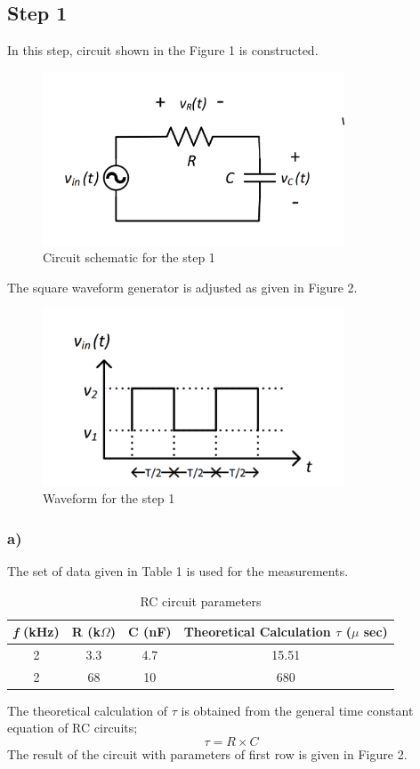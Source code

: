 \documentclass[letterpaper,12pt]{article}
\begin{document}
\subsection{Step 1}
In this step, circuit shown in the Figure 1  is constructed. 
\begin{figure}[H]
	\centering
   \includegraphics[width=0.8\textwidth]{1_sch.png}
   \caption{Circuit schematic for the step 1}
\end{figure} 
The square waveform generator is adjusted as given in Figure 2.
\begin{figure}[H]
	\centering
   \includegraphics[width=0.8\textwidth]{1_signal.png}
   \caption{Waveform for the step 1}
\end{figure} 


\subsubsection{a)}
The set of data given in Table 1 is used for the measurements.

\begin{table}[H]
\begin{center}
\caption{RC circuit parameters}
\vspace{2mm}
	\begin{tabular}{||c | c | c | c||} 
	 \hline
	 \emph{f} (kHz) & R (k\(\Omega\)) & C (nF) & Theoretical Calculation \(\tau\) (\(\mu\) sec) \\ [0.5ex] 
	 \hline\hline
	 2 & 3.3 & 4.7 & 15.51 \\ 
	 \hline
	 2& 68 & 10  & 680  \\
	 \hline
\end{tabular}
\end{center}
\end{table}
The theoretical calculation of \(\tau\) is obtained from the general time constant equation of RC circuits;
\[\tau = R \times C\]
The result of the circuit with parameters of first row is given in Figure 2.
\end{document}
